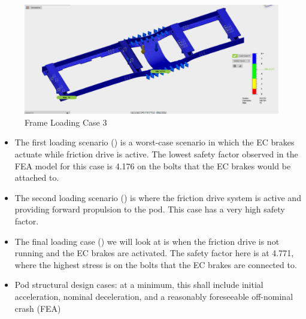 \documentclass[main.tex]{subfiles}
\begin{document}
    \begin{figure}
        \centering
        \includegraphics[width=\linewidth]{images/frame3}
        \caption{Frame Loading Case 3}
        \label{fig:frame3}
    \end{figure}
    \begin{itemize}
    \item The first loading scenario () is a worst-case scenario in which the EC brakes actuate while friction drive is active. The lowest safety factor observed in the FEA model for this case is 4.176 on the bolts that the EC brakes would be attached to.
    \item The second loading scenario () is where the friction drive system is active and providing forward propulsion to the pod. This case has a very high safety factor.
    \item The final loading case () we will look at is when the friction drive is not running and the EC brakes are activated. The safety factor here is at 4.771, where the highest stress is on the bolts that the EC brakes are connected to.
    \item Pod structural design cases: at a minimum, this shall include initial acceleration, nominal deceleration, and a reasonably foreseeable off-nominal crash (FEA)
    \end{itemize}
\end{document}
